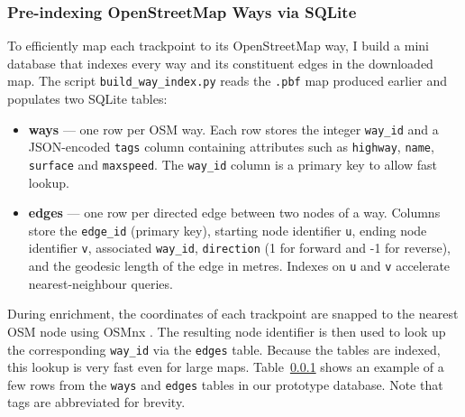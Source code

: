 \documentclass[11pt,twoside]{report}
\begin{document}
\subsubsection{Pre-indexing OpenStreetMap Ways via SQLite}\label{sec:wayindex}
To efficiently map each trackpoint to its OpenStreetMap way, I build a mini database that indexes every way and its constituent edges in the downloaded map. The script \texttt{build\_way\_index.py} reads the \texttt{.pbf} map produced earlier and populates two SQLite tables:
\begin{itemize}
	\item \textbf{ways} --- one row per OSM way. Each row stores the integer \texttt{way\_id} and a JSON-encoded \texttt{tags} column containing attributes such as \texttt{highway}, \texttt{name}, \texttt{surface} and \texttt{maxspeed}. The \texttt{way\_id} column is a primary key to allow fast lookup.
	\item \textbf{edges} --- one row per directed edge between two nodes of a way. Columns store the \texttt{edge\_id} (primary key), starting node identifier \texttt{u}, ending node identifier \texttt{v}, associated \texttt{way\_id}, \texttt{direction} (1 for forward and -1 for reverse), and the geodesic length of the edge in metres. Indexes on \texttt{u} and \texttt{v} accelerate nearest-neighbour queries.
\end{itemize}
During enrichment, the coordinates of each trackpoint are snapped to the nearest OSM node using OSMnx \citep{boeing2017osmnx}. The resulting node identifier is then used to look up the corresponding \texttt{way\_id} via the \texttt{edges} table. Because the tables are indexed, this lookup is very fast even for large maps. Table~\ref{sec:wayindex} shows an example of a few rows from the \texttt{ways} and \texttt{edges} tables in our prototype database. Note that tags are abbreviated for brevity.
\end{document}
